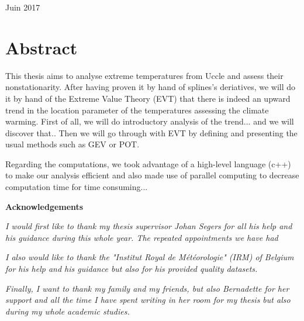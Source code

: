 \documentclass[11pt,a4paper,openany ]{book}
\begin{document}
\vspace{1,5cm}



\begin{center}
	{\large Juin 2017}
\end{center}

\newpage

\dominitoc
\tableofcontents
\newpage
\thispagestyle{empty}
\listoffigures
\thispagestyle{empty}

\newpage


{}
\vspace*{\fill}
\section*{\centering Abstract}
\begin{tcolorbox}%
This thesis aims to analyse extreme temperatures from Uccle and assess their nonstationarity.%
 After having proven it by hand of splines's deriatives, we will do it by hand of the Extreme Value Theory (EVT)  that there is indeed an upward trend in the location parameter of the temperatures assessing the climate warming. First of all, we will do introductory analysis of the trend... and we will discover that..  Then we will go through with EVT by defining and presenting the usual methods such as GEV or POT. 

Regarding the computations, we took advantage of a high-level language (c++) to make our analysis efficient and also made use of parallel computing to decrease computation time for time consuming...
\thispagestyle{empty}
\end{tcolorbox}
\thispagestyle{empty}
\vspace*{\fill}





\newenvironment{acknowledgements}%
{\cleardoublepage\thispagestyle{empty}\null\vfill\begin{center}%
\bfseries Acknowledgements\end{center}}%
{\vfill\null}
%
\begin{acknowledgements}
	\textit{I would first like to thank my thesis supervisor Johan Segers for all his help and his guidance during this whole year. The repeated appointments we have had   }
	\newline
	
	\textit{I also would like to thank the "Institut Royal de Météorologie" (IRM) of Belgium for his help and his guidance but also for his provided quality datasets.}
	\newline
	
	\textit{Finally, I want to thank my family and my friends, but also Bernadette for her support and all the time I have spent  writing in her room for my thesis but also during my whole academic studies.}
	
\end{acknowledgements}
\end{document}
